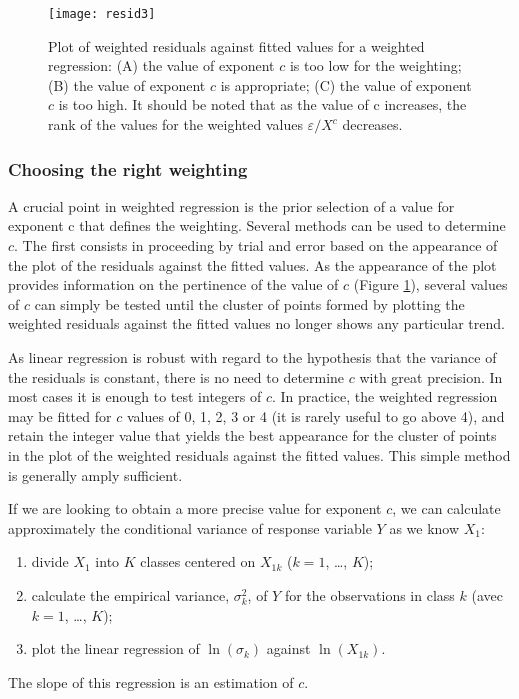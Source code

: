 \begin{figure}[htbp]
\begin{center}
\texttt{[image: resid3]}
\end{center}
\caption[Plot of weighted residuals against fitted values for a weighted regression]{Plot of weighted residuals against fitted values for a weighted regression: (A) the value of exponent $c$ is too low for the weighting; (B) the value of exponent $c$ is appropriate; (C) the value of exponent $c$ is too high. It should be noted that as the value of c increases, the rank of the values for the weighted values $\varepsilon/X^c$ decreases.\label{res3}}
\end{figure}

\subsubsection{Choosing the right weighting\label{chx}}

A crucial point in weighted regression is the prior selection of a value for exponent c that defines the weighting. Several methods can be used to determine $c$. The first consists in proceeding by trial and error based on the appearance of the plot of the residuals against the fitted values. As the appearance of the plot provides information on the pertinence of the value of $c$ (Figure \ref{res3}), several values of $c$ can simply be tested until the cluster of points formed by plotting the weighted residuals against the fitted values no longer shows any particular trend.

As linear regression is robust with regard to the hypothesis that the variance of the residuals is constant, there is no need to determine $c$ with great precision. In most cases it is enough to test integers of $c$. In practice, the weighted regression may be fitted for $c$ values of 0, 1, 2, 3 or 4 (it is rarely useful to go above 4), and retain the integer value that yields the best appearance for the cluster of points in the plot of the weighted residuals against the fitted values. This simple method is generally amply sufficient.

If we are looking to obtain a more precise value for exponent $c$, we can calculate approximately the conditional variance of response variable $Y$ as we know $X_1$:

\begin{enumerate}
\item divide $X_1$ into $K$ classes centered on $X_{1k}$ ($k=1$,
\ldots, $K$);
\item calculate the empirical variance, $\sigma^2_k$, of $Y$ for the observations in class $k$ (avec $k=1$, \ldots,
$K$);
\item plot the linear regression of $\ln(\sigma_k)$ against $\ln(X_{1k})$.
\end{enumerate}
The slope of this regression is an estimation of $c$.

